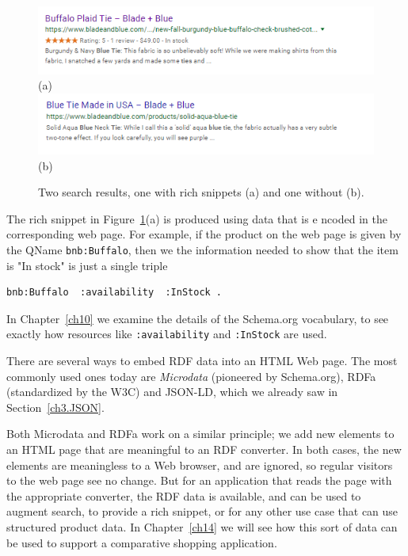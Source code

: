 \begin{figure}
    \centering
    \includegraphics{SWWOv3/media/ch4/WithRichSnippet.png}
    (a)
    \includegraphics{SWWOv3/media/ch4/WithoutRichSnippet.png}
    (b)
    \caption{Two search results, one with rich snippets (a) and one without (b). }
    \label{fig:ch4.RS}
\end{figure}

The rich snippet in Figure~\ref{fig:ch4.RS}(a) is produced using data that is e
ncoded in the corresponding 
web page.  For example, if the product on the web page is given by the QName \texttt{bnb:Buffalo},  
then we the information needed to show that the item is "In stock" is just 
a single triple

\begin{lstlisting}
bnb:Buffalo  :availability  :InStock .
\end{lstlisting}


In Chapter~\ref{ch10} we examine the details of the Schema.org vocabulary, to 
see exactly how  resources like \texttt{:availability} and \texttt{:InStock} are used. 

There are several ways to embed RDF data into an HTML Web page.  The most commonly used ones
today are \emph{Microdata} (pioneered by Schema.org), RDFa (standardized by the W3C)
and JSON-LD, which we already saw in Section~\ref{ch3.JSON}. 

Both Microdata and RDFa work on a similar principle; we add new elements to an 
HTML page that are meaningful to an RDF converter.  In both cases, the new elements
are meaningless to a Web browser, and are ignored, so regular visitors to the
web page see no change.  But for an application that reads the page with the appropriate
converter, the RDF data is available, and can be used to augment search, to provide
a rich snippet, or for any other use case that can use structured product data.  In 
Chapter~\ref{ch14} we will see how this sort of data can be used to support a comparative
shopping application. 

